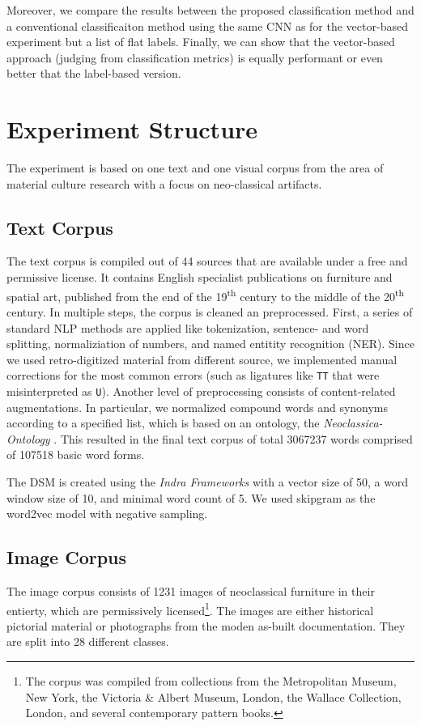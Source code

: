 Moreover, we compare the results between the proposed classification method and a conventional classificaiton method using the same CNN as for the vector-based experiment but a list of flat labels. Finally, we can show that the vector-based approach (judging from classification metrics) is equally performant or even better that the label-based version.


\section{Experiment Structure}
The experiment is based on one text and one visual corpus from the area of material culture research with a focus on neo-classical artifacts.

\subsection{Text Corpus}
The text corpus is compiled out of 44 sources that are available under a free and permissive license. It contains English specialist publications on furniture and spatial art, published from the end of the 19\textsuperscript{th} century to the middle of the 20\textsuperscript{th} century. In multiple steps, the corpus is cleaned an preprocessed. First, a series of standard NLP methods are applied like tokenization, sentence- and word splitting, normaliziation of numbers, and named entitity recognition (NER). Since we used retro-digitized material from different source, we implemented manual corrections for the most common errors (such as ligatures like \texttt{TT} that were misinterpreted as \texttt{U}). Another level of preprocessing consists of content-related augmentations. In particular, we normalized compound words and synonyms according to a specified list, which is based on an ontology, the \emph{Neoclassica-Ontology} \parencite{donig_NeoclassicaMultilingualDomainOntology_2016}. This resulted in the final text corpus of total \num{3067237} words comprised of \num{107518} basic word forms.

The DSM is created using the \emph{Indra Frameworks} \parencite{sales_IndraWordEmbeddingSemanticRelatedness_2018a} with a vector size of \num{50}, a word window size of \num{10}, and minimal word count of \num{5}. We used skipgram as the word2vec model \parencite{mikolov_EfficientEstimationWordRepresentationsVector_2013} with negative sampling.

\subsection{Image Corpus}
The image corpus consists of \num{1231} images of neoclassical furniture in their entierty, which are permissively licensed\footnote{The corpus was compiled from collections from the Metropolitan Museum, New York, the Victoria \& Albert Museum, London, the Wallace Collection, London, and several contemporary pattern books.}. The images are either historical pictorial material or photographs from the moden as-built documentation. They are split into \num{28} different classes.

